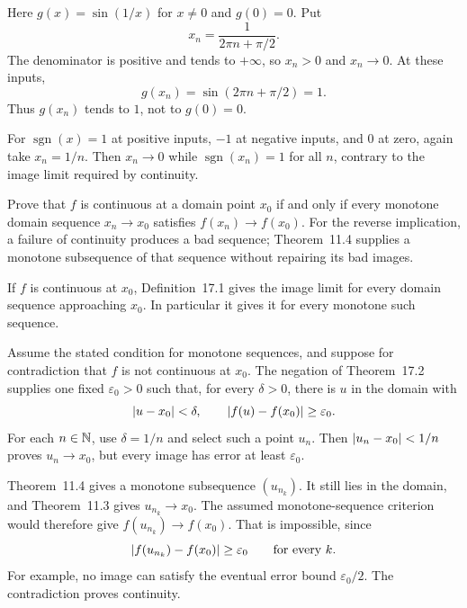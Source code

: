 Here $g(x)=\sin(1/x)$ for $x\ne0$ and $g(0)=0$.
Put
\[
 x_n=\frac1{2\pi n+\pi/2}.
\]
The denominator is positive and tends to $+\infty$, so
$x_n>0$ and $x_n\to0$. At these inputs,
\[
 g(x_n)=\sin(2\pi n+\pi/2)=1.
\]
Thus $g(x_n)$ tends to $1$, not to $g(0)=0$.

For $\operatorname{sgn}(x)=1$ at positive inputs, $-1$ at
negative inputs, and $0$ at zero, again take $x_n=1/n$.
Then $x_n\to0$ while $\operatorname{sgn}(x_n)=1$ for all
$n$, contrary to the image limit required by continuity.

\goal Prove that $f$ is continuous at a domain point $x_0$
if and only if every monotone domain sequence $x_n\to x_0$
satisfies $f(x_n)\to f(x_0)$.
\idea For the reverse implication, a failure of continuity
produces a bad sequence; Theorem~11.4 supplies a monotone
subsequence of that sequence without repairing its bad images.

If $f$ is continuous at $x_0$, Definition~17.1 gives the image
limit for every domain sequence approaching $x_0$. In particular
it gives it for every monotone such sequence.

Assume the stated condition for monotone sequences, and suppose
for contradiction that $f$ is not continuous at $x_0$.
The negation of Theorem~17.2 supplies one fixed
$\varepsilon_0>0$ such that, for every $\delta>0$, there is
$u$ in the domain with
\[
 \left|u-x_0\right|<\delta,\qquad
 \left|f(u)-f(x_0)\right|\ge\varepsilon_0.
\]
For each $n\in\mathbb{N}$, use $\delta=1/n$ and select such a point
$u_n$. Then $\left|u_n-x_0\right|<1/n$ proves $u_n\to x_0$,
but every image has error at least $\varepsilon_0$.

Theorem~11.4 gives a monotone subsequence $(u_{n_k})$.
It still lies in the domain, and Theorem~11.3 gives
$u_{n_k}\to x_0$. The assumed monotone-sequence criterion
would therefore give $f(u_{n_k})\to f(x_0)$.
That is impossible, since
\[
 \left|f(u_{n_k})-f(x_0)\right|\ge\varepsilon_0
 \qquad\text{for every }k.
\]
For example, no image can satisfy the eventual error bound
$\varepsilon_0/2$. The contradiction proves continuity.


